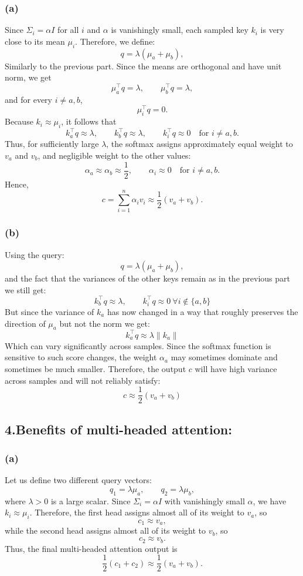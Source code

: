 \documentclass{article}
\begin{document}
\subsubsection*{(a)}
Since $\Sigma_i=\alpha I$ for all $i$ and $\alpha$ is vanishingly small, each sampled key $k_i$ is very close to its mean $\mu_i$. Therefore, we define:
\[
q=\lambda(\mu_a+\mu_b),
\]
Similarly to the previous part. Since the means are orthogonal and have unit norm, we get
\[
\mu_a^\top q=\lambda,\qquad \mu_b^\top q=\lambda,
\]
and for every $i\neq a,b$,
\[
\mu_i^\top q=0.
\]
Because $k_i\approx \mu_i$, it follows that
\[
k_a^\top q\approx \lambda,\qquad k_b^\top q\approx \lambda,\qquad k_i^\top q\approx 0 \quad \text{for } i\neq a,b.
\]
Thus, for sufficiently large $\lambda$, the softmax assigns approximately equal weight to $v_a$ and $v_b$, and negligible weight to the other values:
\[
\alpha_a\approx \alpha_b\approx \frac{1}{2},\qquad \alpha_i\approx 0 \quad \text{for } i\neq a,b.
\]
Hence,
\[
c=\sum_{i=1}^n \alpha_i v_i \approx \frac{1}{2}(v_a+v_b).
\]

\subsubsection*{(b)}
Using the query:
\[
q=\lambda(\mu_a+\mu_b),
\]
and the fact that the variances of the other keys remain as in the previous part we still get:
\[
k_b^\top q\approx\lambda,\qquad k_i^\top q\approx0\ \forall i\notin\{a,b\}
\]
But since the variance of $k_a$ has now changed in a way that roughly preserves the direction of $\mu_a$ but not the norm we get:
\[
k_a^\top q\approx\lambda\lVert k_a\rVert
\]
Which can vary significantly across samples. Since the softmax function is sensitive to such score changes,
the weight $\alpha_a$ may sometimes dominate and sometimes be much smaller.
Therefore, the output $c$ will have high variance across samples and will not reliably satisfy:
\[
c\approx\frac{1}{2}(v_a+v_b)
\]


\newpage
\subsection*{4.Benefits of multi-headed attention:}
\subsubsection*{(a)}
Let us define two different query vectors:
\[
q_1=\lambda \mu_a,\qquad q_2=\lambda \mu_b,
\]
where $\lambda>0$ is a large scalar. Since $\Sigma_i=\alpha I$ with vanishingly small $\alpha$, we have $k_i\approx \mu_i$. Therefore, the first head assigns almost all of its weight to $v_a$, so
\[
c_1\approx v_a,
\]
while the second head assigns almost all of its weight to $v_b$, so
\[
c_2\approx v_b.
\]
Thus, the final multi-headed attention output is
\[
\frac{1}{2}(c_1+c_2)\approx \frac{1}{2}(v_a+v_b).
\]
\end{document}
